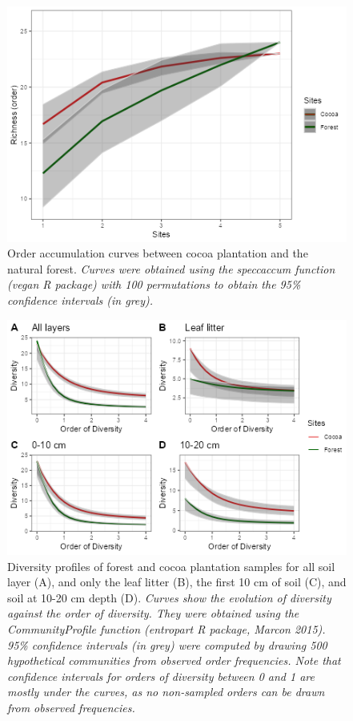 \documentclass[fleqn,10pt]{ArtEcoFoG} %
\begin{document}
\begin{figure}

{\centering \includegraphics[width=0.8\linewidth,]{rapport_files/figure-latex/accumcurve-1} 

}

\caption{Order accumulation curves between cocoa plantation and the natural forest. \textit{Curves were obtained using the speccaccum function (vegan R package) with 100 permutations to obtain the 95\% confidence intervals (in grey).}}\label{fig:accumcurve}
\end{figure}

\normalsize

\scriptsize

\begin{figure}

{\centering \includegraphics[width=0.8\linewidth,]{rapport_files/figure-latex/diversity-1} 

}

\caption{Diversity profiles of forest and cocoa plantation samples for all soil layer (A), and only the leaf litter (B), the first 10 cm of soil (C), and soil at 10-20 cm depth (D). \textit{Curves show the evolution of diversity against the order of diversity. They were obtained using the CommunityProfile function (entropart R package, Marcon 2015). 95\% confidence intervals (in grey) were computed by drawing 500 hypothetical communities from observed order frequencies. Note that confidence intervals for orders of diversity between 0 and 1 are mostly under the curves, as no non-sampled orders can be drawn from observed frequencies.}}\label{fig:diversity}
\end{figure}
\end{document}
